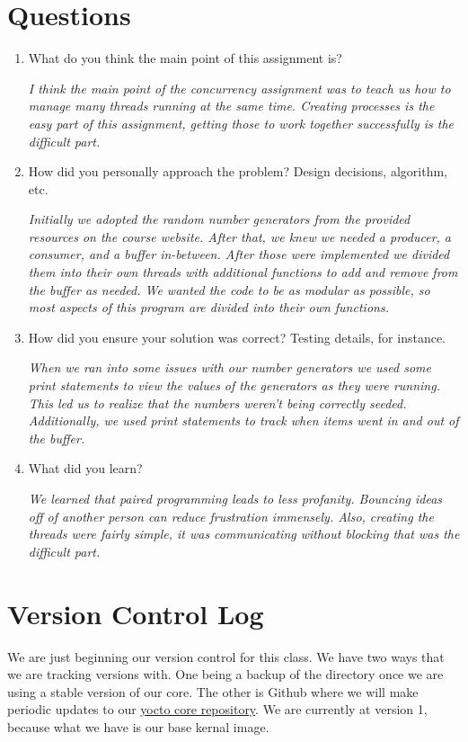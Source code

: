 \documentclass[letterpaper,10pt,titlepage]{article}
\begin{document}
\section*{Questions}
\begin{enumerate}
\item{What do you think the main point of this assignment is?}

\textsl{I think the main point of the concurrency assignment was to teach us 
how to manage many threads running at the same time. Creating processes is the 
easy part of this assignment, getting those to work together successfully is the 
difficult part.} 
\item{How did you personally approach the problem? Design decisions, algorithm, 
etc.}

\textsl{Initially we adopted the random number generators from the provided 
resources on the course website. After that, we knew we needed a producer, 
a consumer, and a buffer in-between. After those were implemented we divided 
them into their own threads with additional functions to add and remove from 
the buffer as needed. We wanted the code to be as modular as possible, so 
most aspects of this program are divided into their own functions.}
\item{How did you ensure your solution was correct? Testing details, for 
instance.}

\textsl{When we ran into some issues with our number generators we used some 
print statements to view the values of the generators as they were running. 
This led us to realize that the numbers weren't being correctly seeded. 
Additionally, we used print statements to track when items went in and out of 
the buffer.}
\item{What did you learn?}

\textsl{We learned that paired programming leads to less profanity. Bouncing 
ideas off of another person can reduce frustration immensely. Also, creating the 
threads were fairly simple, it was communicating without blocking that was the 
difficult part.}
\end{enumerate}
\section*{Version Control Log}
We are just beginning our version control for this class. We have two ways that 
we are tracking versions with. One being a backup of the directory once we are 
using a stable version of our core. The other is Github where we will make 
periodic updates to our \href{https://github.com/sherburj/yocto_core}{yocto core 
repository}. We are currently at version 1, because what we have is our base 
kernal image. 
\end{document}

